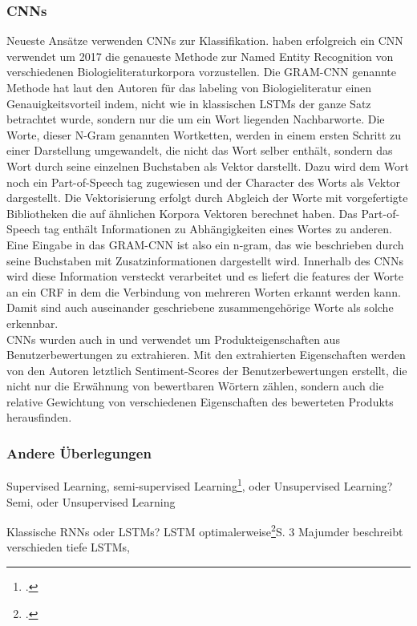 \documentclass[paper=a4,12pt,listof=totoc]{scrartcl}%
\begin{document}
	\subsubsection{CNNs}
	Neueste Ansätze verwenden CNNs zur Klassifikation. \cite{Zhu.2018} haben erfolgreich ein CNN verwendet um 2017 die genaueste Methode zur Named Entity Recognition von verschiedenen Biologieliteraturkorpora vorzustellen. Die GRAM-CNN genannte Methode hat laut den Autoren für das labeling von Biologieliteratur einen Genauigkeitsvorteil indem, nicht wie in klassischen LSTMs der ganze Satz betrachtet wurde, sondern nur die um ein Wort liegenden Nachbarworte. Die Worte, dieser N-Gram genannten Wortketten, werden in einem ersten Schritt zu einer Darstellung umgewandelt, die nicht das Wort selber enthält, sondern das Wort durch seine einzelnen Buchstaben als Vektor darstellt. Dazu wird dem Wort noch ein Part-of-Speech tag zugewiesen und der Character des Worts als Vektor dargestellt. 
	Die Vektorisierung erfolgt durch Abgleich der Worte mit vorgefertigte Bibliotheken die auf ähnlichen Korpora Vektoren berechnet haben. Das Part-of-Speech tag enthält Informationen zu Abhängigkeiten eines Wortes zu anderen. Eine Eingabe in das GRAM-CNN ist also ein n-gram, das wie beschrieben durch seine Buchstaben mit Zusatzinformationen dargestellt wird.
	Innerhalb des CNNs wird diese Information versteckt verarbeitet und es liefert die features der Worte an ein CRF in dem die Verbindung von mehreren Worten erkannt werden kann. Damit sind auch auseinander geschriebene zusammengehörige Worte als solche erkennbar.\\
	CNNs wurden auch in \cite{Lee.2019} und \cite{Lee.2020} verwendet um Produkteigenschaften aus Benutzerbewertungen zu extrahieren. Mit den extrahierten Eigenschaften werden von den Autoren letztlich Sentiment-Scores der Benutzerbewertungen erstellt, die nicht nur die Erwähnung von bewertbaren Wörtern zählen, sondern auch die relative Gewichtung von verschiedenen Eigenschaften des bewerteten Produkts herausfinden.\\
	
	
	\subsubsection{Andere Überlegungen}
	Supervised Learning, semi-supervised Learning\footcite{Ghani.2006}, oder Unsupervised Learning? Semi, oder Unsupervised Learning
	
	Klassische RNNs oder LSTMs? LSTM optimalerweise\footcite{Majumder.30.03.2018}{S. 3} Majumder beschreibt verschieden tiefe LSTMs, 
\end{document}

